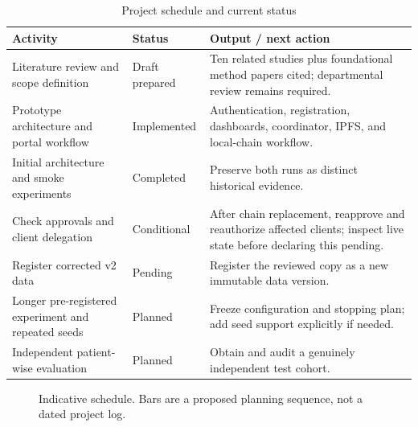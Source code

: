 \documentclass[12pt,a4paper]{report}
\begin{document}
\begin{table}[htbp]
\centering
\caption{Project schedule and current status}
\label{tab:schedule}
\begin{tabularx}{\textwidth}{p{}p{}Y}
\toprule
\textbf{Activity} & \textbf{Status} & \textbf{Output / next action} \\
\midrule
Literature review and scope definition & Draft prepared & Ten related studies plus foundational method papers cited; departmental review remains required. \\
Prototype architecture and portal workflow & Implemented & Authentication, registration, dashboards, coordinator, IPFS, and local-chain workflow. \\
Initial architecture and smoke experiments & Completed & Preserve both runs as distinct historical evidence. \\
Check approvals and client delegation & Conditional & After chain replacement, reapprove and reauthorize affected clients; inspect live state before declaring this pending. \\
Register corrected v2 data & Pending & Register the reviewed copy as a new immutable data version. \\
Longer pre-registered experiment and repeated seeds & Planned & Freeze configuration and stopping plan; add seed support explicitly if needed. \\
Independent patient-wise evaluation & Planned & Obtain and audit a genuinely independent test cohort. \\
\bottomrule
\end{tabularx}
\end{table}

\begin{figure}[htbp]
\centering
\singlespacing
{}
\doublespacing
\caption{Indicative schedule. Bars are a proposed planning sequence, not a dated project log.}
\label{fig:gantt}
\end{figure}
\end{document}
